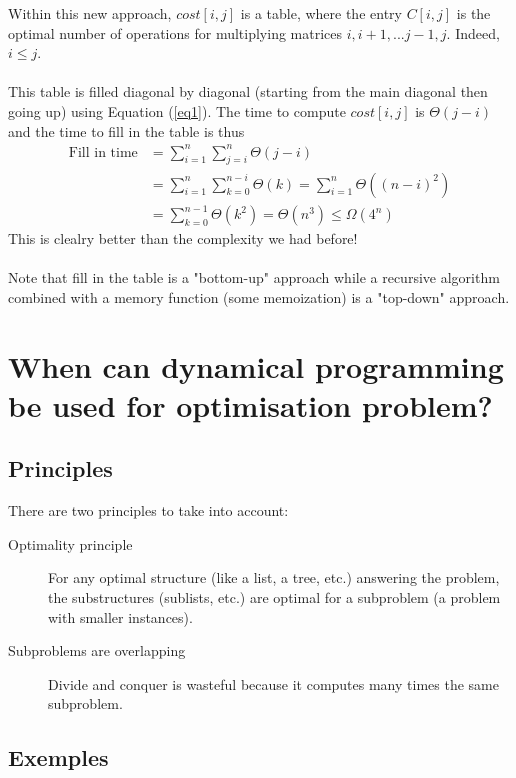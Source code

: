 Within this new approach, $cost[i,j]$ is a table, where the entry $C[i,j]$ is the optimal number of operations for multiplying matrices $i,i+1,...j-1,j$. Indeed, $i\leq j$.
\\ \\
This table is filled diagonal by diagonal (starting from the main diagonal then going up) using Equation (\ref{eq1}). The time to compute $cost[i,j]$ is $\Theta (j-i)$ and the time to fill in the table is thus 
\begin{align*}
\text{Fill in time} & = \sum_{i=1}^n \sum_{j=i}^n \Theta (j-i) \\
& = \sum_{i=1}^n \sum_{k=0}^{n-i} \Theta (k) = \sum_{i=1}^n \Theta ( (n-i)^2) \\
& = \sum_{k=0}^{n-1} \Theta (k^2) = \Theta (n^3) \leq \Omega (4^n)
\end{align*} 
This is clealry better than the complexity we had before!
\\ \\
Note that fill in the table is a "bottom-up" approach while a recursive algorithm combined with a memory function (some memoization) is a "top-down" approach.

\section{When can dynamical programming be used for optimisation problem?}

\subsection{Principles}

There are two principles to take into account:

\begin{description}
\item[Optimality principle] For any optimal structure (like a list, a tree, etc.) answering the problem, the substructures (sublists, etc.) are optimal for a subproblem (a problem with smaller instances). 
\item[Subproblems are overlapping] Divide and conquer is wasteful because it computes many times the same subproblem.
\end{description}

\subsection{Exemples}

